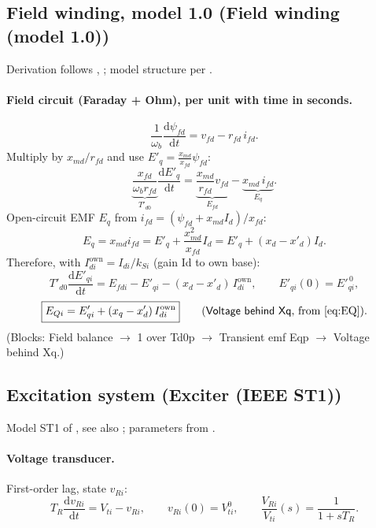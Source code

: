 \documentclass[11pt,a4paper]{article}
\numberwithin{equation}{section}
\newcommand{\dd}{\mathrm{d}}
\newcommand{\blk}[1]{\textsf{#1}}
\begin{document}
\subsection{Field winding, model 1.0 (\blk{Field winding (model 1.0)})}\label{sec:field}
Derivation follows \cite[Ch.~3]{SauerPai1998}, \cite[Ch.~3]{Kundur1994}; model structure per \cite{IEEE1110}.
\paragraph{Field circuit (Faraday + Ohm), per unit with time in seconds.}
\begin{equation}
\frac{1}{\omega_b}\frac{\dd\psi_{fd}}{\dd t} = v_{fd} - r_{fd}\,i_{fd}.
\end{equation}
Multiply by $x_{md}/r_{fd}$ and use $E'_q = \frac{x_{md}}{x_{fd}}\psi_{fd}$:
\begin{equation}
\underbrace{\frac{x_{fd}}{\omega_b r_{fd}}}_{T'_{d0}}\frac{\dd E'_q}{\dd t}
= \underbrace{\frac{x_{md}}{r_{fd}}v_{fd}}_{E_{fd}} - \underbrace{x_{md}\,i_{fd}}_{E_q}.
\end{equation}
Open-circuit EMF $E_q$ from $i_{fd} = (\psi_{fd}+x_{md}I_d)/x_{fd}$:
\begin{equation}
E_q = x_{md}i_{fd} = E'_q + \frac{x_{md}^2}{x_{fd}}I_d = E'_q + (x_d - x'_d)I_d .
\end{equation}
Therefore, with $I_{di}^{\text{own}} = I_{di}/k_{Si}$ (gain \blk{Id to own base}):
\begin{equation}
\boxed{T'_{d0}\frac{\dd E'_{qi}}{\dd t} = E_{fdi} - E'_{qi} - (x_d - x'_d)\,I_{di}^{\text{own}},\qquad E'_{qi}(0) = E'^{\,0}_{qi},}
\label{eq:field}
\end{equation}
\begin{equation}
\boxed{E_{Qi} = E'_{qi} + (x_q - x'_d)\,I_{di}^{\text{own}}}\qquad\text{(\blk{Voltage behind Xq}, from \eqref{eq:EQ})}.
\end{equation}
(Blocks: \blk{Field balance} $\to$ \blk{1 over Td0p} $\to$ \blk{Transient emf Eqp} $\to$ \blk{Voltage behind Xq}.)

\subsection{Excitation system (\blk{Exciter (IEEE ST1)})}
Model ST1 of \cite{IEEE4215}, see also \cite[Ch.~8]{Kundur1994}; parameters from \cite[Table~6]{RA2021access}.
\paragraph{Voltage transducer.} First-order lag, state $v_{Ri}$:
\begin{equation}
\boxed{T_R\frac{\dd v_{Ri}}{\dd t} = V_{ti} - v_{Ri},\qquad v_{Ri}(0) = V_{ti}^0,}
\qquad \frac{V_{Ri}}{V_{ti}}(s) = \frac{1}{1+sT_R}.
\end{equation}
\end{document}
